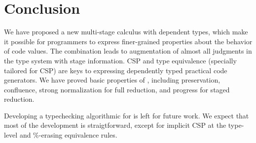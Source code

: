 
\section{Conclusion \label{sec:conclusion}}

We have proposed a new multi-stage calculus \LMD with dependent types,
which make it possible for programmers to express finer-grained
properties about the behavior of code values.  The combination leads
to augmentation of almost all judgments in the type system with stage
information.  CSP and type equivalence (specially tailored for CSP) are
keys to expressing dependently typed practical code generators.  We
have proved basic properties of \LMD, including preservation,
confluence, strong normalization for full reduction, and progress for
staged reduction.

Developing a typechecking algorithmic for \LMD is left for future
work.  We expect that most of the development is straigtforward,
except for implicit CSP at the type-level and \%-erasing equivalence
rules.
